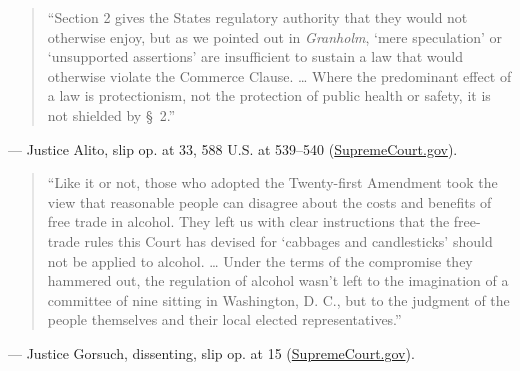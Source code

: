 \documentclass[12pt]{article}
\begin{document}
\begin{quote}
``Section 2 gives the States regulatory authority that they would not otherwise enjoy, but as we pointed out in \textit{Granholm}, `mere speculation' or `unsupported assertions' are insufficient to sustain a law that would otherwise violate the Commerce Clause. \ldots{} Where the predominant effect of a law is protectionism, not the protection of public health or safety, it is not shielded by \S~2.''
\end{quote}
\noindent --- Justice Alito, slip op. at 33, 588 U.S. at 539--540 (\href{https://www.supremecourt.gov/opinions/18pdf/18-96_5i36.pdf}{SupremeCourt.gov}).

\begin{quote}
``Like it or not, those who adopted the Twenty-first Amendment took the view that reasonable people can disagree about the costs and benefits of free trade in alcohol. They left us with clear instructions that the free-trade rules this Court has devised for `cabbages and candlesticks' should not be applied to alcohol. \ldots{} Under the terms of the compromise they hammered out, the regulation of alcohol wasn't left to the imagination of a committee of nine sitting in Washington, D. C., but to the judgment of the people themselves and their local elected representatives.''
\end{quote}
\noindent --- Justice Gorsuch, dissenting, slip op. at 15 (\href{https://www.supremecourt.gov/opinions/18pdf/18-96_5i36.pdf}{SupremeCourt.gov}).
\end{document}
